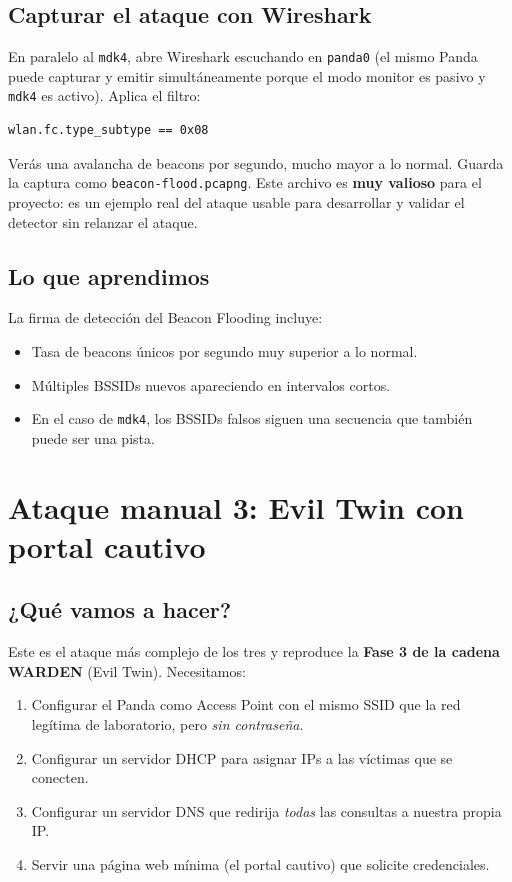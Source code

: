 \documentclass[11pt,a4paper]{article}
\begin{document}
\subsection{Capturar el ataque con Wireshark}
En paralelo al \texttt{mdk4}, abre Wireshark escuchando en \texttt{panda0}
(el mismo Panda puede capturar y emitir simultáneamente porque el modo
monitor es pasivo y \texttt{mdk4} es activo). Aplica el filtro:

\begin{lstlisting}
wlan.fc.type_subtype == 0x08
\end{lstlisting}

Verás una avalancha de beacons por segundo, mucho mayor a lo normal.
Guarda la captura como \texttt{beacon-flood.pcapng}. Este archivo es
\textbf{muy valioso} para el proyecto: es un ejemplo real del ataque
usable para desarrollar y validar el detector sin relanzar el ataque.

\subsection{Lo que aprendimos}
La firma de detección del Beacon Flooding incluye:

\begin{itemize}
  \item Tasa de beacons únicos por segundo muy superior a lo normal.
  \item Múltiples BSSIDs nuevos apareciendo en intervalos cortos.
  \item En el caso de \texttt{mdk4}, los BSSIDs falsos siguen una
    secuencia que también puede ser una pista.
\end{itemize}

\section{Ataque manual 3: Evil Twin con portal cautivo}

\subsection{¿Qué vamos a hacer?}
Este es el ataque más complejo de los tres y reproduce la \textbf{Fase 3
de la cadena WARDEN} (Evil Twin). Necesitamos:

\begin{enumerate}
  \item Configurar el Panda como Access Point con el mismo SSID que la
    red legítima de laboratorio, pero \emph{sin contraseña}.
  \item Configurar un servidor DHCP para asignar IPs a las víctimas que
    se conecten.
  \item Configurar un servidor DNS que redirija \emph{todas} las consultas
    a nuestra propia IP.
  \item Servir una página web mínima (el portal cautivo) que solicite
    credenciales.
\end{enumerate}
\end{document}
